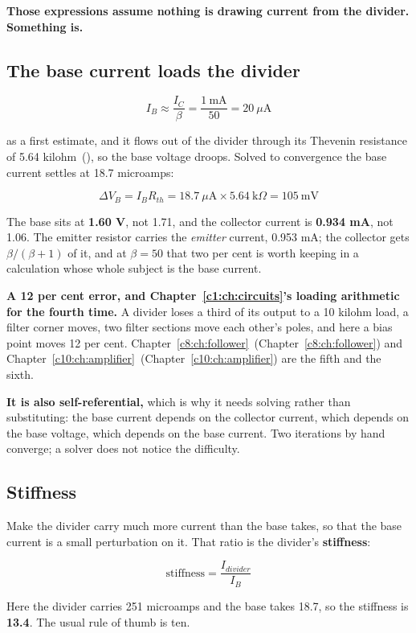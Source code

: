 \textbf{Those expressions assume nothing is drawing current from the divider. Something is.}

\subsection{The base current loads the divider}
\label{c6:sec:a3}
\[
  I_B \approx \frac{I_C}{\beta} = \frac{1\ \text{mA}}{50} = 20\ \mu\text{A}
\]

as a first estimate, and it flows out of the divider through its Thevenin resistance of 5.64 kilohm~(), so the base voltage droops. Solved to convergence the base current settles at 18.7 microamps:

\[
  \Delta V_B = I_B R_{th} = 18.7\ \mu\text{A} \times 5.64\ \text{k}\Omega = 105\ \text{mV}
\]

The base sits at \textbf{1.60 V}, not 1.71, and the collector current is \textbf{0.934 mA}, not 1.06. The emitter resistor carries the \emph{emitter} current, 0.953 mA; the collector gets $\beta/(\beta+1)$ of it, and at $\beta = 50$ that two per cent is worth keeping in a calculation whose whole subject is the base current.

\textbf{A 12 per cent error, and Chapter~\ref{c1:ch:circuits}'s loading arithmetic for the fourth time.} A divider loses a third of its output to a 10 kilohm load, a filter corner moves, two filter sections move each other's poles, and here a bias point moves 12 per cent. Chapter~\ref{c8:ch:follower}~(Chapter~\ref{c8:ch:follower}) and Chapter~\ref{c10:ch:amplifier}~(Chapter~\ref{c10:ch:amplifier}) are the fifth and the sixth.

\textbf{It is also self-referential,} which is why it needs solving rather than substituting: the base current depends on the collector current, which depends on the base voltage, which depends on the base current. Two iterations by hand converge; a solver does not notice the difficulty.

\subsection{Stiffness}
\label{c6:sec:a4}
Make the divider carry much more current than the base takes, so that the base current is a small perturbation on it. That ratio is the divider's \textbf{stiffness}:

\[
  \text{stiffness} = \frac{I_{divider}}{I_B}
\]

Here the divider carries 251 microamps and the base takes 18.7, so the stiffness is \textbf{13.4}. The usual rule of thumb is ten.

